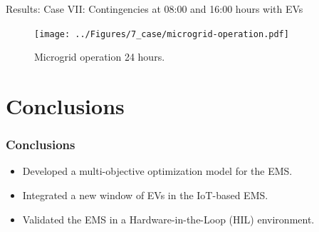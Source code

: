 \documentclass[10pt, aspectratio=1610]{beamer}
\begin{document}
\begin{frame}{Results: Case VII: Contingencies at 08:00 and 16:00 hours with EVs}
\begin{figure}
    \texttt{[image: ../Figures/7\_case/microgrid-operation.pdf]}
    \caption{Microgrid operation 24 hours.}
\end{figure}
\end{frame}



\section{Conclusions}

\begin{frame}
    \frametitle{Conclusions}

    \begin{itemize}[<+->]
        \item Developed a multi-objective optimization model for the EMS. 
        \item Integrated a new window of EVs in the IoT-based EMS.
        \item Validated the EMS in a Hardware-in-the-Loop (HIL) environment.
    \end{itemize}
\end{frame}
\end{document}
